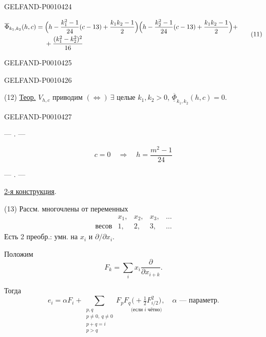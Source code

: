 \begin{GelfandAdjacentEvidence}{GELFAND-P001042}{4}


\begin{equation*}
\begin{aligned}
\overline\Phi_{k_1,k_2}(h,c)
={}&\Bigl(h-\frac{k_1^2-1}{24}(c-13)+\frac{k_1k_2-1}{2}\Bigr)
    \Bigl(h-\frac{k_2^2-1}{24}(c-13)+\frac{k_1k_2-1}{2}\Bigr)+\\
&+\frac{(k_1^2-k_2^2)^2}{16}
\end{aligned}
\tag{11}
\end{equation*}
\end{GelfandAdjacentEvidence}
\begin{GelfandAdjacentEvidence}{GELFAND-P001042}{5}

\end{GelfandAdjacentEvidence}
\begin{GelfandAdjacentEvidence}{GELFAND-P001042}{6}


(12) \underline{Теор.} $V_{h,c}$ приводим
$(\Leftrightarrow)\ \exists$ целые $k_1,k_2>0$,
$\underline{\overline\Phi}_{k_1,k_2}(h,c)=0$.
\end{GelfandAdjacentEvidence}
\begin{GelfandAdjacentEvidence}{GELFAND-P001042}{7}


\begin{center}— . —\end{center}
\[
c=0\quad\Rightarrow\quad h=\frac{m^2-1}{24}
\]
\begin{center}— . —\end{center}

\underline{2-я конструкция}.

(13) Рассм. многочлены от переменных
\[
\begin{array}{ccccc}
&x_1,&x_2,&x_3,&\ldots\\
\text{весов}&1,&2,&3,&\ldots
\end{array}
\]
Есть 2 преобр.: умн. на $x_i$ и $\partial/\partial x_i$.

Положим
\begin{equation*}
F_k=\sum_i x_i\frac{\partial}{\partial x_{i+k}}.
\tag{14}
\end{equation*}

Тогда
\begin{equation*}
e_i=\alpha F_i+
\sum_{\substack{p,q\\p\ne0,\ q\ne0\\p+q=i\\p>q}}F_pF_q
\underset{\text{(если \(i\) чётно)}}{\bigl(+\tfrac12 F_{i/2}^{2}\bigr)},
\quad\alpha\text{ — параметр.}
\tag{15}
\end{equation*}
\end{GelfandAdjacentEvidence}


